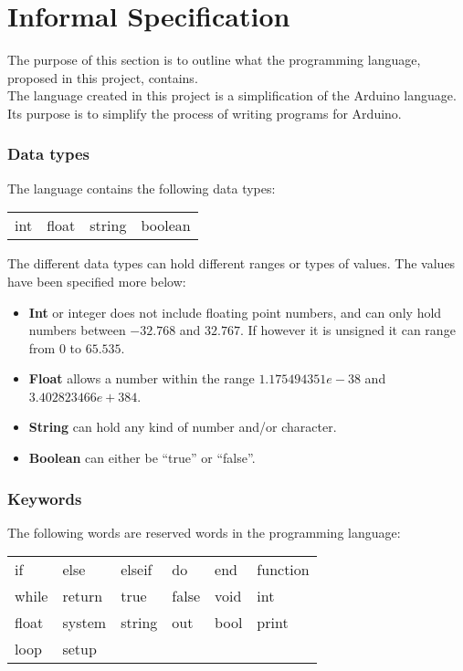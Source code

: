 \chapter{Informal Specification}\label{analysis:informal-specification}
The purpose of this section is to outline what the programming language, proposed in this project, contains.
\\The language created in this project is a simplification of the Arduino language. Its purpose is to simplify the process of writing programs for Arduino.   

\subsection{Data types}
The language contains the following data types: \\ 
\begin{center}
\begin{tabular}{ l l l l}
int & float & string & boolean \\
\end{tabular}
\end{center}

The different data types can hold different ranges or types of values. The values have been specified more below: 
\begin{itemize}
\item \textbf{Int} or integer does not include floating point numbers, and can only hold numbers between $-32.768$ and $32.767$. If however it is unsigned it can range from $0$ to $65.535$. 
\item \textbf{Float} allows a number within the range $1.175494351e-38$ and $3.402823466e+384$.
\item \textbf{String} can hold any kind of number and/or character. 
\item \textbf{Boolean} can either be ``true'' or ``false''. 
\end{itemize}

\subsection{Keywords}
The following words are reserved words in the programming language:\\ 
\begin{center}
\begin{tabular}{ l l l l l l}
if & else & elseif & do & end & function \\
while & return & true & false & void & int \\
float & system & string & out & bool & print\\
loop & setup \\
\end{tabular}
\end{center}


